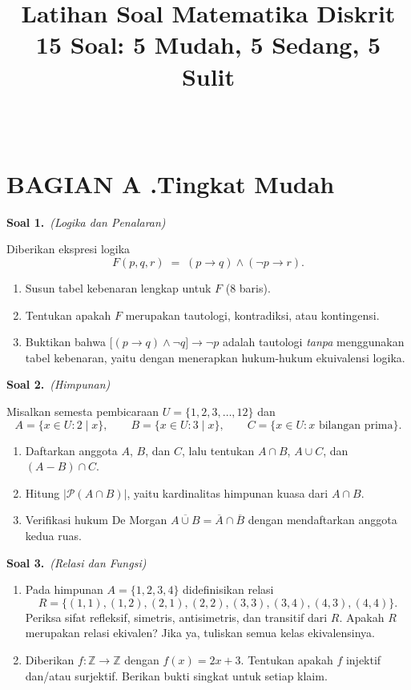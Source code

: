 \documentclass[11pt,a4paper]{article}
\title{\vspace{-1.5cm}\textbf{Latihan Soal Matematika Diskrit}\\[4pt]
\large 15 Soal: 5 Mudah, 5 Sedang, 5 Sulit}
\author{}
\date{}
\newcommand{\soal}[2]{%
  \vspace{4pt}\noindent\textbf{Soal #1.}\ \textit{(#2)}\par\nobreak\vspace{2pt}}
\newcommand{\Comp}[1]{\overline{#1}}
\newcommand{\Zset}{\mathbb{Z}}
\begin{document}
\maketitle
\vspace{-1.8cm}

\begin{center}
\begin{tabular}{ll}

\end{tabular}
\end{center}

\vspace{6pt}

\section*{BAGIAN A .Tingkat Mudah}

\soal{1}{Logika dan Penalaran}
Diberikan ekspresi logika
\[
F(p,q,r) \;=\; (p \rightarrow q) \wedge (\neg p \rightarrow r).
\]
\begin{enumerate}[label=(\alph*),leftmargin=*]
  \item Susun tabel kebenaran lengkap untuk $F$ (8 baris).
  \item Tentukan apakah $F$ merupakan tautologi, kontradiksi, atau kontingensi.
  \item Buktikan bahwa $\big[(p \rightarrow q) \wedge \neg q\big] \rightarrow \neg p$ adalah tautologi
        \emph{tanpa} menggunakan tabel kebenaran, yaitu dengan menerapkan hukum-hukum
        ekuivalensi logika.
\end{enumerate}

\soal{2}{Himpunan}
Misalkan semesta pembicaraan $U = \{1,2,3,\dots,12\}$ dan
\[
A = \{x \in U : 2 \mid x\}, \qquad
B = \{x \in U : 3 \mid x\}, \qquad
C = \{x \in U : x \text{ bilangan prima}\}.
\]
\begin{enumerate}[label=(\alph*),leftmargin=*]
  \item Daftarkan anggota $A$, $B$, dan $C$, lalu tentukan
        $A \cap B$, $A \cup C$, dan $(A - B) \cap C$.
  \item Hitung $|\mathcal{P}(A \cap B)|$, yaitu kardinalitas himpunan kuasa dari $A \cap B$.
  \item Verifikasi hukum De Morgan $\Comp{A \cup B} = \Comp{A} \cap \Comp{B}$
        dengan mendaftarkan anggota kedua ruas.
\end{enumerate}

\soal{3}{Relasi dan Fungsi}
\begin{enumerate}[label=(\alph*),leftmargin=*]
  \item Pada himpunan $A = \{1,2,3,4\}$ didefinisikan relasi
  \[
  R = \{(1,1),(1,2),(2,1),(2,2),(3,3),(3,4),(4,3),(4,4)\}.
  \]
  Periksa sifat refleksif, simetris, antisimetris, dan transitif dari $R$.
  Apakah $R$ merupakan relasi ekivalen? Jika ya, tuliskan semua kelas ekivalensinya.
  \item Diberikan $f : \Zset \rightarrow \Zset$ dengan $f(x) = 2x + 3$.
  Tentukan apakah $f$ injektif dan/atau surjektif. Berikan bukti singkat untuk
  setiap klaim.
\end{enumerate}
\end{document}
